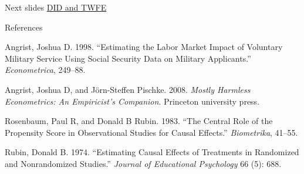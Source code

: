 \documentclass[
  ignorenonframetext,
]{beamer}
\newlength{\cslhangindent}
\newlength{\cslentryspacingunit} %
\newenvironment{CSLReferences}[2] %
 {%
  \setlength{\parindent}{0pt}
  \ifodd #1
  \let\oldpar\par
  \def\par{\hangindent=\cslhangindent\oldpar}
  \fi
  \setlength{\parskip}{#2\cslentryspacingunit}
 }%
 {}
\begin{document}
\begin{frame}{Next slides}
\protect\hypertarget{next-slides}{}
\href{https://jisangyu-agecon.github.io/AGEC936/Lectures/AGEC936_DD_FE_Synth.html}{DID
and TWFE}
\end{frame}

\begin{frame}{References}
\protect\hypertarget{references}{}
\hypertarget{refs}{}
\begin{CSLReferences}{1}{0}
\leavevmode{}%
Angrist, Joshua D. 1998. {``Estimating the Labor Market Impact of
Voluntary Military Service Using Social Security Data on Military
Applicants.''} \emph{Econometrica}, 249--88.

\leavevmode{}%
Angrist, Joshua D, and Jörn-Steffen Pischke. 2008. \emph{Mostly Harmless
Econometrics: An Empiricist's Companion}. Princeton university press.

\leavevmode{}%
Rosenbaum, Paul R, and Donald B Rubin. 1983. {``The Central Role of the
Propensity Score in Observational Studies for Causal Effects.''}
\emph{Biometrika}, 41--55.

\leavevmode{}%
Rubin, Donald B. 1974. {``Estimating Causal Effects of Treatments in
Randomized and Nonrandomized Studies.''} \emph{Journal of Educational
Psychology} 66 (5): 688.

\end{CSLReferences}
\end{frame}
\end{document}
